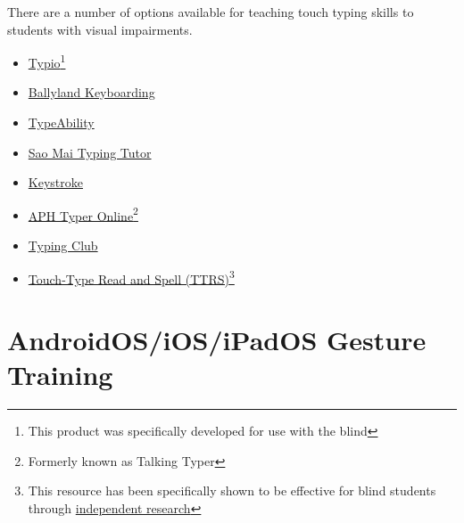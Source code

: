 There are a number of options available for teaching touch typing skills to students with visual impairments. 
\begin{itemize}[leftmargin=*]
 \item \href{https://www.accessibyte.com/typio-online-page/}{Typio}\footnote{\raggedright This product was specifically developed for use with the blind}
 \item \href{https://www.sonokids.org/ballyland-early-learning/ballyland-keyboarding/}{Ballyland Keyboarding}\footnotemark[\value{footnote}] 
 \item \href{https://www.yesaccessible.com/}{TypeAbility}\footnotemark[\value{footnote}]
 \item \href{https://saomaicenter.org/en/smsoft/smtt}{Sao Mai Typing Tutor}\footnotemark[\value{footnote}]
 \item \href{https://www.cfb.state.nm.us/apps/}{Keystroke}\footnotemark[\value{footnote}]
 \item \href{https://typer.aphtech.org/}{APH Typer Online}\footnotemark[\value{footnote}]\fnsep\footnote{\raggedright Formerly known as Talking Typer}
 \item \href{https://www.typingclub.com/}{Typing Club}
 \item \href{https://www.readandspell.com/us/typing-for-the-blind}{Touch-Type Read and Spell (TTRS)}\footnote{\raggedright This resource has been specifically shown to be effective for blind students through \href{https://www.readandspell.com/sites/default/files/Research/greenrich\_report\_-ttrs\_for\_visually\_imparied.pdf}{independent research}} 
\end{itemize}

\pagebreak\hypertarget{appx6}{}\section[AndroidOS/iOS/iPadOS Gesture Training]{AndroidOS/iOS/iPadOS Gesture Training}\label{appx6}

